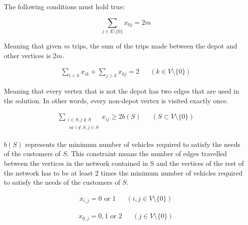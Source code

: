 \noindent
The following conditions must hold true:

\begin{equation}
\label{eq:baseformula2}
\displaystyle \sum_{j \in E \setminus\{0\}} x_{0j} = 2m
\end{equation}

\noindent
Meaning that given $m$ trips, the sum of the trips made between the depot and other vertices is $2m$. \cite{laporte2007you}


\begin{equation}
\begin{aligned}
\label{eq:baseformula3}
\displaystyle\sum_{i < k} x_{ik} + \displaystyle\sum_{j > k} x_{kj} = 2 && (k \in V \setminus\{0\})
\end{aligned}
\end{equation}

\noindent
Meaning that every vertex that is not the depot has two edges that are used in the solution. In other words, every non-depot vertex is visited exactly once. \cite{laporte2007you}


\begin{equation}
\begin{aligned}
\label{eq:baseformula4}
\displaystyle\sum_{\substack{i \in S, j \notin S \\ 
\text{ or } i \notin S, j \in S}} x_{ij} \geq 2b(S) && (S \subset V \setminus\{0\})
\end{aligned}
\end{equation}

\noindent
$b(S)$ represents the minimum number of vehicles required to satisfy the needs of the customers of $S$. This constraint means the number of edges travelled between the vertices in the network contained in S and the vertices of the rest of the network has to be at least 2 times the minimum number of vehicles required to satisfy the needs of the customers of $S$. \cite{laporte2007you}



\begin{equation}
\begin{aligned}
\label{eq:baseformula5}
x_{i,j} = 0 \text{ or } 1 && (i, j \in V\setminus\{0\})
\end{aligned}
\end{equation}


\begin{equation}
\begin{aligned}
\label{eq:baseformula6}
x_{0,j} = 0, 1 \text{ or } 2 && (j \in V\setminus\{0\})
\end{aligned}
\end{equation}

